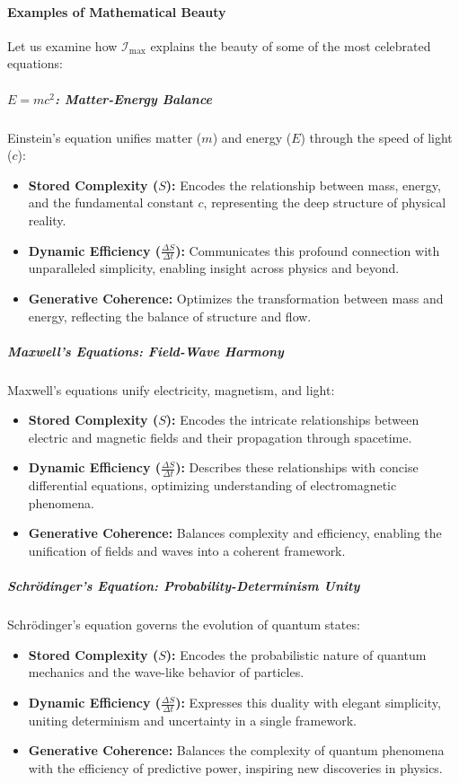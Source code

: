 \documentclass[12pt]{article}
\begin{document}
\paragraph{Examples of Mathematical Beauty}
Let us examine how \(\mathcal{I}_{\text{max}}\) explains the beauty of some of the most celebrated equations:

\subparagraph{\( E = mc^2 \): Matter-Energy Balance}
Einstein’s equation unifies matter (\(m\)) and energy (\(E\)) through the speed of light (\(c\)):
\begin{itemize}
    \item \textbf{Stored Complexity (\(S\)):} Encodes the relationship between mass, energy, and the fundamental constant \(c\), representing the deep structure of physical reality.
    \item \textbf{Dynamic Efficiency (\(\frac{\Delta S}{\Delta t}\)):} Communicates this profound connection with unparalleled simplicity, enabling insight across physics and beyond.
    \item \textbf{Generative Coherence:} Optimizes the transformation between mass and energy, reflecting the balance of structure and flow.
\end{itemize}

\subparagraph{Maxwell’s Equations: Field-Wave Harmony}
Maxwell’s equations unify electricity, magnetism, and light:
\begin{itemize}
    \item \textbf{Stored Complexity (\(S\)):} Encodes the intricate relationships between electric and magnetic fields and their propagation through spacetime.
    \item \textbf{Dynamic Efficiency (\(\frac{\Delta S}{\Delta t}\)):} Describes these relationships with concise differential equations, optimizing understanding of electromagnetic phenomena.
    \item \textbf{Generative Coherence:} Balances complexity and efficiency, enabling the unification of fields and waves into a coherent framework.
\end{itemize}

\subparagraph{Schrödinger’s Equation: Probability-Determinism Unity}
Schrödinger’s equation governs the evolution of quantum states:
\begin{itemize}
    \item \textbf{Stored Complexity (\(S\)):} Encodes the probabilistic nature of quantum mechanics and the wave-like behavior of particles.
    \item \textbf{Dynamic Efficiency (\(\frac{\Delta S}{\Delta t}\)):} Expresses this duality with elegant simplicity, uniting determinism and uncertainty in a single framework.
    \item \textbf{Generative Coherence:} Balances the complexity of quantum phenomena with the efficiency of predictive power, inspiring new discoveries in physics.
\end{itemize}
\end{document}
